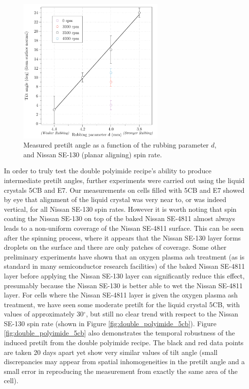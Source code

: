 \begin{figure}
\begin{center}
\includegraphics[width=0.65\textwidth]{Figures/Pretilt/double_polyimide}
\end{center}
\caption[Pretilt angle as a function of rubbing parameter]{\label{fig:double_polyimide} Measured pretilt angle as a function of the rubbing parameter $d$, and Nissan SE-130 (planar aligning) spin rate.}
\end{figure}

In order to truly test the double polyimide recipe's ability to produce intermediate pretilt angles, further experiments were carried out using the liquid crystals 5CB and E7. Our measurements on cells filled with 5CB and E7 showed by eye that alignment of the liquid crystal was very near to, or was indeed vertical, for all Nissan SE-130 spin rates. However it is worth noting that spin coating the Nissan SE-130 on top of the baked Nissan SE-4811 almost always leads to a non-uniform coverage of the Nissan SE-4811 surface. This can be seen after the spinning process, where it appears that the Nissan SE-130 layer forms droplets on the surface and there are only patches of coverage. Some other preliminary experiments have shown that an oxygen plasma ash treatment (as is standard in many semiconductor research facilities) of the baked Nissan SE-4811 layer before applying the Nissan SE-130 layer can significantly reduce this effect, presumably because the Nissan SE-130 is better able to wet the Nissan SE-4811 layer. For cells where the Nissan SE-4811 layer is given the oxygen plasma ash treatment, we have seen some moderate pretilt for the liquid crystal 5CB, with values of approximately 30$^{\circ}$, but still no clear trend with respect to the Nissan SE-130 spin rate (shown in Figure \ref{fig:double_polyimide_5cb}). Figure \ref{fig:double_polyimide_5cb} also demonstrates the temporal robustness of the induced pretilt from the double polyimide recipe. The black and red data points are taken 20 days apart yet show very similar values of tilt angle (small discrepancies may appear from spatial inhomogeneities in the pretilt angle and a small error in reproducing the measurement from exactly the same area of the cell). 

